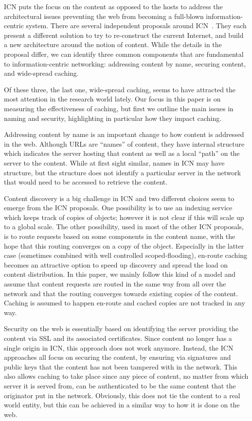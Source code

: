 \documentclass{sigcomm-alternate}
\begin{document}
ICN puts the focus on the content as opposed to the hosts to address the architectural issues preventing the web from becoming a full-blown information-centric system.
There are several independent proposals around ICN~\cite{jacobson:ccn, koponen:dona, netinf, psirp}.
They each present a different solution to try to re-construct the current Internet, and build a new architecture around the notion of content.
While the details in the proposal differ, we can identify three common components that are fundamental to information-centric networking: addressing content by name, securing content, and wide-spread caching.

Of these three, the last one, wide-spread caching, seems to have attracted the most attention in the research world lately.
Our focus in this paper is on measuring the effectiveness of caching, but first we outline the main issues in naming and security, highlighting in particular how they impact caching.

Addressing content by name is an important change to how content is addressed in the web.
Although URLs are ``names'' of content, they have internal structure which indicates the server hosting that content as well as a local ``path'' on the server to the content.
While at first sight similar, names in ICN may have structure, but the structure does not identify a particular server in the network that would need to be accessed to retrieve the content.

Content discovery is a big challenge in ICN and two different choices seem to emerge from the ICN proposals.
One possibility is to use an indexing service~\cite{netinf} which keeps track of copies of objects; however it is not clear if this will scale up to a global scale.
The other possibility, used in most of the other ICN proposals, is to route requests based on some components in the content name, with the hope that this routing converges on a copy of the object.
Especially in the latter case (sometimes combined with well controlled scoped-flooding\cite{wang:diluvian}), en-route caching becomes an attractive option to speed up discovery and spread the load on content distribution.
In this paper, we mainly follow this kind of a model and assume that content requests are routed in the same way from all over the network and that the routing converges towards existing copies of the content.
Caching is assumed to happen en-route and cached copies are not tracked in any way.

Security on the web is essentially based on identifying the server providing the content via SSL and its associated certificates.
Since content no longer has a single origin in ICN, this approach does not work anymore.
Instead, the ICN approaches all focus on securing the content, by ensuring via signatures and public keys that the content has not been tampered with in the network.
This also allows caching to take place since any piece of content, no matter from which server it is served from, can be authenticated to be the same content that the originator put in the network.
Obviously, this does not tie the content to a real world entity, but this can be achieved in a similar way to how it is done on the web.
\end{document}

